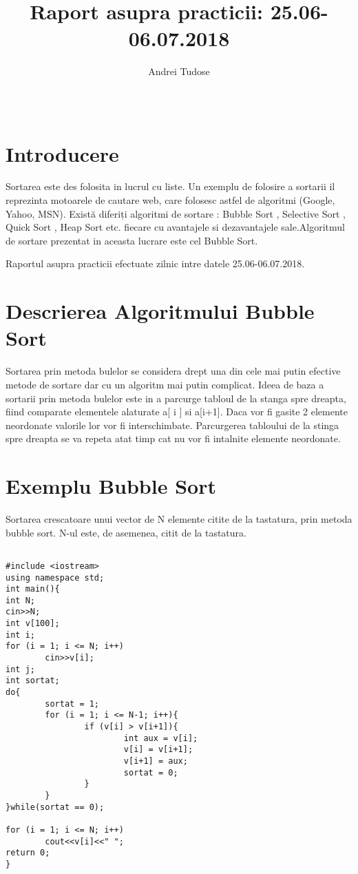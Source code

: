 \documentclass{report}
\title{{\sc Raport asupra practicii: 25.06-06.07.2018}}
\author{Andrei Tudose}
\date{\,}
\begin{document}
\maketitle

\tableofcontents

\chapter{Introducere}

Sortarea este des folosita in lucrul cu liste. Un exemplu de folosire a sortarii il reprezinta
motoarele de cautare web, care folosesc astfel de algoritmi (Google, Yahoo, MSN).
 Există diferiți algoritmi de sortare : Bubble Sort , Selective Sort , Quick Sort , Heap Sort etc.
fiecare cu avantajele si dezavantajele sale.Algoritmul de sortare prezentat in aceasta lucrare este cel Bubble Sort.

\vskip 0.5cm

Raportul asupra practicii efectuate zilnic intre datele 25.06-06.07.2018. 
\chapter{Descrierea Algoritmului Bubble Sort}
Sortarea prin metoda bulelor se considera drept una din cele mai putin efective metode de
sortare dar cu un algoritm mai putin complicat.
Ideea de baza a sortarii prin metoda bulelor este in a parcurge tabloul de la stanga spre dreapta,
fiind comparate elementele alaturate a[ i ] si a[i+1]. Daca vor fi gasite 2 elemente neordonate
valorile lor vor fi interschimbate.
 Parcurgerea tabloului de la stinga spre dreapta se va repeta atat timp cat nu vor fi intalnite
elemente neordonate. 
\chapter{Exemplu Bubble Sort}
 Sortarea crescatoare unui vector de N elemente citite de la tastatura, prin metoda bubble sort. N-ul este, de asemenea, citit de la tastatura. 


\begin{lstlisting}

#include <iostream>
using namespace std;
int main(){
int N;
cin>>N;        
int v[100]; 
int i;
for (i = 1; i <= N; i++) 
        cin>>v[i];      
int j;
int sortat; 
do{        
        sortat = 1;
        for (i = 1; i <= N-1; i++){
                if (v[i] > v[i+1]){
                        int aux = v[i]; 
                        v[i] = v[i+1]; 
                        v[i+1] = aux;
                        sortat = 0;
                }
        }
}while(sortat == 0);

for (i = 1; i <= N; i++) 
        cout<<v[i]<<" ";        
return 0;
}
\end{lstlisting}
\end{document}
